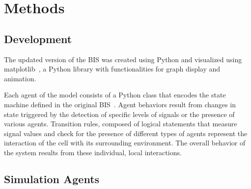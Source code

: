 \documentclass[10pt,conference]{IEEEtran}
\begin{document}
\vspace{.5in}
\section{Methods}
\subsection{Development}
The updated version of the BIS was created using Python and visualized using
matplotlib~\cite{Hunter:2007}, a Python library with functionalities for graph
display and animation.

\indent
Each agent of the model consists of a Python class that encodes the state
machine defined in the original BIS~\cite{Folcik:2007}. Agent behaviors result
from changes in state triggered by the detection of specific levels of signals
or the presence of various agents.  Transition rules, composed of logical
statements that measure signal values and check for the presence of different
types of agents represent the interaction of the cell with its surrounding
environment. The overall behavior of the system results from these individual,
local interactions.

\subsection{Simulation Agents}
\end{document}
